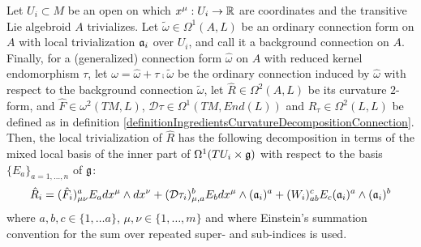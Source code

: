 \begin{theorem}
Let $U_i \subset M$ be an open on which $x^\mu: U_i \to \mathbb{R}$ are coordinates and the transitive Lie algebroid $A$ trivializes. Let $\tilde \omega\in \Omega^1(A, L)$ be an ordinary connection form on $A$ with local trivialization $\mathfrak{a}_i$ over $U_i$, and call it a background connection on $A$. Finally, for a (generalized) connection form $\hat \omega$ on $A$ with reduced kernel endomorphism $\tau$, let $\omega = \hat \omega + \tau \comp \tilde \omega$ be the ordinary connection induced by $\hat \omega$ with respect to the background connection $\tilde \omega$, let $\hat R \in \Omega^2(A, L)$ be its curvature $2$-form, and $\hat F \in \omega^2(TM, L)$, $\mathcal D \tau \in \Omega^1(TM, End(L))$ and $R_\tau \in \Omega^2(L, L)$ be defined as in definition \ref{definitionIngredientsCurvatureDecompositionConnection}. Then, the local trivialization of $\hat R$ has the following decomposition in terms of the mixed local basis of the inner part of $\Omega^1(TU_i \times \mathfrak{g})$ with respect to the basis $\{E_a\}_{a = 1, \dots, n}$ of $\mathfrak{g}$:
\begin{equation}
    \hat R_i = (\hat F_i)_{\mu \nu}^a E_a dx^\mu \wedge dx^\nu + 
                (\mathcal D \tau_i)^b_{\mu, a} E_b  dx^\mu \wedge (\mathfrak{a}_i)^a +
                (W_i)^c_{ab} E_c (\mathfrak{a}_i)^a \wedge (\mathfrak{a}_i)^b
\end{equation}
where $a, b, c \in \{1, \dots a\}$, $\mu, \nu \in \{1, \dots, m\}$ and where Einstein's summation convention for the sum over repeated super- and sub-indices is used.
\end{theorem}
